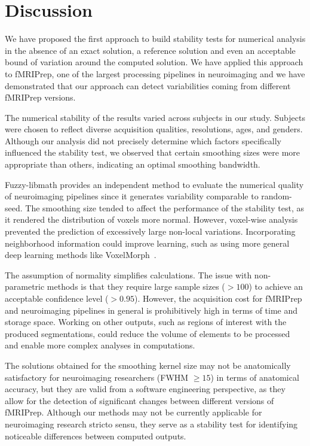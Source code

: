 \documentclass[lettersize,journal]{IEEEtran}
\newcommand{\fmriprep}{fMRIPrep\xspace}
\begin{document}
\section{Discussion}


We have proposed the first approach to build stability tests for numerical analysis in the absence of an exact solution, a reference solution and even an acceptable bound of variation around the computed solution. We have applied this approach to \fmriprep, one of the largest processing pipelines in neuroimaging and we have demonstrated that our approach can detect variabilities coming from different \fmriprep versions.

The numerical stability of the results varied across subjects in our study. Subjects were chosen to reflect diverse acquisition qualities, resolutions, ages, and genders. Although our analysis did not precisely determine which factors specifically influenced the stability test, we observed that certain smoothing sizes were more appropriate than others, indicating an optimal smoothing bandwidth.

Fuzzy-libmath provides an independent method to evaluate the numerical quality of neuroimaging pipelines since it generates variability comparable to random-seed. The smoothing size tended to affect the performance of the stability test, as it rendered the distribution of voxels more normal. However, voxel-wise analysis prevented the prediction of excessively large non-local variations. Incorporating neighborhood information could improve learning, such as using more general deep learning methods like VoxelMorph~\cite{balakrishnan2019voxelmorph}.

The assumption of normality simplifies calculations. The issue with non-parametric methods is that they require large sample sizes ($>100$) to achieve an acceptable confidence level ($>0.95$). However, the acquisition cost for \fmriprep and neuroimaging pipelines in general is prohibitively high in terms of time and storage space. Working on other outputs, such as regions of interest with the produced segmentations, could reduce the volume of elements to be processed and enable more complex analyses in computations.

The solutions obtained for the smoothing kernel size may not be anatomically satisfactory for neuroimaging researchers (FWHM $\geq 15$) in terms of anatomical accuracy, but they are valid from a software engineering perspective, as they allow for the detection of significant changes between different versions of \fmriprep. Although our methods may not be currently applicable for neuroimaging research stricto sensu, they serve as a stability test for identifying noticeable differences between computed outputs.
\end{document}
